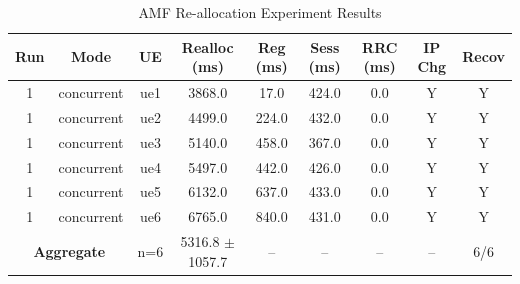 \begin{table}[ht]
\centering
\begin{tabular}{|c|c|c|c|c|c|c|c|c|}
\hline
Run & Mode & UE & Realloc (ms) & Reg (ms) & Sess (ms) & RRC (ms) & IP Chg & Recov \\
\hline
1 & concurrent & ue1 & 3868.0 & 17.0 & 424.0 & 0.0 & Y & Y \\
1 & concurrent & ue2 & 4499.0 & 224.0 & 432.0 & 0.0 & Y & Y \\
1 & concurrent & ue3 & 5140.0 & 458.0 & 367.0 & 0.0 & Y & Y \\
1 & concurrent & ue4 & 5497.0 & 442.0 & 426.0 & 0.0 & Y & Y \\
1 & concurrent & ue5 & 6132.0 & 637.0 & 433.0 & 0.0 & Y & Y \\
1 & concurrent & ue6 & 6765.0 & 840.0 & 431.0 & 0.0 & Y & Y \\
\multicolumn{2}{|c|}{\textbf{Aggregate}} & n=6 & 5316.8 $\pm$ 1057.7 & -- & -- & -- & -- & 6/6 \\
\hline
\end{tabular}
\caption{AMF Re-allocation Experiment Results}
\label{tab:amf_realloc}
\end{table}
